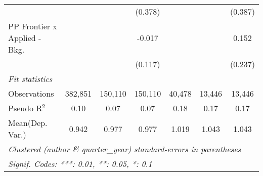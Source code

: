 \begin{tabular}{lcccccc}
                                  &              &               & (0.378)        &               &         & (0.387)\\   
   PP Frontier x Applied - Bkg.   &              &               & -0.017         &               &         & 0.152\\   
                                  &              &               & (0.117)        &               &         & (0.237)\\   
   \midrule
   \emph{Fit statistics}\\
   Observations                   & 382,851      & 150,110       & 150,110        & 40,478        & 13,446  & 13,446\\  
   Pseudo R$^2$                   & 0.10         & 0.07          & 0.07           & 0.18          & 0.17    & 0.17\\  
Mean(Dep. Var.) & 0.942 & 0.977 & 0.977 & 1.019 & 1.043 & 1.043 \\
   \midrule \midrule
   \multicolumn{7}{l}{\emph{Clustered (author \& quarter\_year) standard-errors in parentheses}}\\
   \multicolumn{7}{l}{\emph{Signif. Codes: ***: 0.01, **: 0.05, *: 0.1}}\\
\end{tabular}
\par\endgroup

